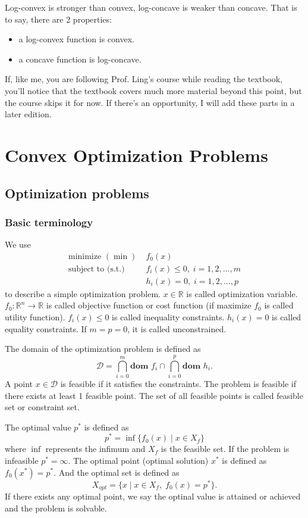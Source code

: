 \documentclass[lang=en,color=blue,mode=fancy,titlestyle=hang]{elegantbook}
\begin{document}
Log-convex is stronger than convex, log-concave is weaker than concave. That is to say,
there are 2 properties:
\begin{itemize}
  \item a log-convex function is convex.
  \item a concave function is log-concave.
\end{itemize}

If, like me, you are following Prof. Ling's course while reading the textbook,
you'll notice that the textbook covers much more material beyond this point, but the
course skips it for now. If there's an opportunity, I will add these parts in a later
edition.

\newpage
\chapter{Convex Optimization Problems}
\section{Optimization problems}
\subsection{Basic terminology}
We use
\begin{align}
  \text{minimize } (\min) \; &f_0(x) \nonumber\\
  \text{subject to (s.t.)}\; &f_i(x) \leq 0, \; i = 1, 2, \ldots, m \\
  &h_i(x) = 0, \; i = 1, 2, \ldots, p \nonumber
\end{align}
to describe a simple optimization problem. $x \in \mathbb{R}$ is called optimization
variable. $f_0: \mathbb{R}^n \rightarrow \mathbb{R}$ is called objective function or
cost function (if maximize $f_0$ is called utility function). $f_i(x) \leq 0$ is called
inequality constraints. $h_i(x) = 0$ is called equality constraints. If $m = p = 0$, it
is called unconstrained.

The domain of the optimization problem is defined as
\[
\mathcal{D} = \bigcap_{i = 0}^m \textbf{dom } f_i \cap \bigcap_{i = 0}^p \textbf{dom } h_i.
\]
A point $x \in \mathcal{D}$ is feasible if it satisfies the constraints. The problem is
feasible if there exists at least 1 feasible point. The set of all feasible points is called
feasible set or constraint set.

The optimal value $p^*$ is defined as
\[
p^* = \inf \{f_0(x) \;|\; x \in X_f\}
\]
where $\inf$ represents the infimum and $X_f$ is the feasible set. If the problem is
infeasible $p^* = \infty$. The optimal point (optimal solution) $x^*$ is defined as
$f_0(x^*) = p^*$. And the optimal set is defined as
\[
X_{opt} = \{x \;|\; x \in X_f, \; f_0(x) = p^*\}.
\]
If there exists any optimal point, we say the optinal value is attained or achieved and
the problem is solvable.
\end{document}

